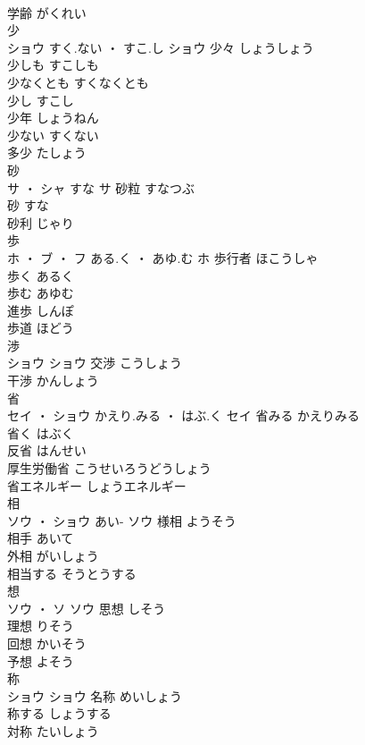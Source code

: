 \documentclass[8pt]{extreport}
\begin{document}
\begin{CJK}{UTF8}{min}
\\	学齢	がくれい	
\\	少	
\\	ショウ	すく.ない ・ すこ.し	ショウ	少々	しょうしょう	
\\	少しも	すこしも	
\\	少なくとも	すくなくとも	
\\	少し	すこし	
\\	少年	しょうねん	
\\	少ない	すくない	
\\	多少	たしょう	
\\	砂	
\\	サ ・ シャ	すな	サ													砂粒	すなつぶ	
\\	砂	すな	
\\	砂利	じゃり	
\\	歩	
\\	ホ ・ ブ ・ フ	ある.く ・ あゆ.む	ホ	歩行者	ほこうしゃ	
\\	歩く	あるく	
\\	歩む	あゆむ	
\\	進歩	しんぽ	
\\	歩道	ほどう	
\\	渉	
\\	ショウ		ショウ	交渉	こうしょう	
\\	干渉	かんしょう	
\\	省	
\\	セイ ・ ショウ	かえり.みる ・ はぶ.く	セイ	省みる	かえりみる	
\\	省く	はぶく	
\\	反省	はんせい	
\\	厚生労働省	こうせいろうどうしょう	
\\	省エネルギー	しょうエネルギー	
\\	相	
\\	ソウ ・ ショウ	あい-	ソウ	様相	ようそう	
\\	相手	あいて	
\\	外相	がいしょう	
\\	相当する	そうとうする	
\\	想	
\\	ソウ ・ ソ		ソウ	思想	しそう	
\\	理想	りそう	
\\	回想	かいそう	
\\	予想	よそう	
\\	称	
\\	ショウ		ショウ	名称	めいしょう	
\\	称する	しょうする	
\\	対称	たいしょう	

\end{CJK}
\end{document}
